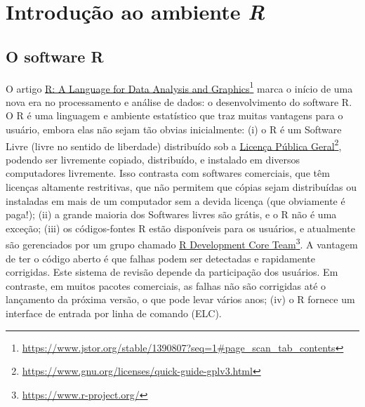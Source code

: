 \documentclass[]{book}
\let\rmarkdownfootnote\footnote%
\def\footnote{\protect\rmarkdownfootnote}
\begin{document}
\hypertarget{intro}{%
\chapter{\texorpdfstring{Introdução ao ambiente \emph{R}}{Introdução ao ambiente R}}\label{intro}}

\hypertarget{o-software-r}{%
\section{O software R}\label{o-software-r}}

O artigo \href{https://www.jstor.org/stable/1390807?seq=1\#page_scan_tab_contents}{R: A Language for Data Analysis and Graphics}\footnote{\url{https://www.jstor.org/stable/1390807?seq=1\#page_scan_tab_contents}} marca o início de uma nova era no processamento e análise de dados: o desenvolvimento do software R. O R é uma linguagem e ambiente estatístico que traz muitas vantagens para o usuário, embora elas não sejam tão obvias inicialmente: (i) o R é um Software Livre (livre no sentido de liberdade) distribuído sob a \href{https://www.gnu.org/licenses/quick-guide-gplv3.html}{Licença Pública Geral}\footnote{\url{https://www.gnu.org/licenses/quick-guide-gplv3.html}}, podendo ser livremente copiado, distribuído, e instalado em diversos computadores livremente. Isso contrasta com softwares comerciais, que têm licenças altamente restritivas, que não permitem que cópias sejam distribuídas ou instaladas em mais de um computador sem a devida licença (que obviamente é paga!); (ii) a grande maioria dos Softwares livres são grátis, e o R não é uma exceção; (iii) os códigos-fontes R estão disponíveis para os usuários, e atualmente são gerenciados por um grupo chamado \href{https://www.r-project.org/}{R Development Core Team}\footnote{\url{https://www.r-project.org/}}. A vantagem de ter o código aberto é que falhas podem ser detectadas e rapidamente corrigidas. Este sistema de revisão depende da participação dos usuários. Em contraste, em muitos pacotes comerciais, as falhas não são corrigidas até o lançamento da próxima versão, o que pode levar vários anos; (iv) o R fornece um interface de entrada por linha de comando (ELC).
\end{document}
